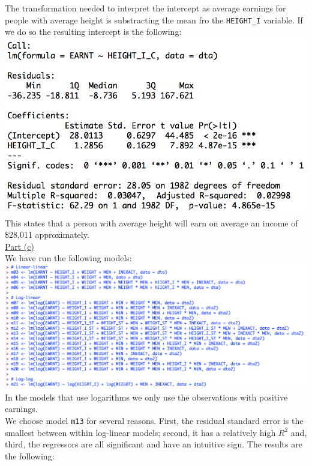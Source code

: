 \documentclass[a4paper, 11pt]{article}
\begin{document}
\newline The transformation needed to interpret the intercept as average earnings for people with average height is substracting the mean fro the \texttt{HEIGHT\_I} variable. If we do so the resulting intercept is the following:\\
\includegraphics[scale=0.7]{reg2.png}
\newline This states that a person with average height will earn on average an income of  \$28,011 approximately.\\
\newline \underline{Part (c)}\\
\newline We have run the following models:\\
\includegraphics[scale=0.5]{reg3.png}
\newline In the models that use logarithms we only use the observations with positive earnings.\\
\newline We choose model \texttt{m13} for several reasons. First, the residual standard error is the smallest between within log-linear models; second, it has a relatively high $R^2$ and, third, the regressors are all significant and have an intuitive sign. The results are the following:\\
\end{document}
